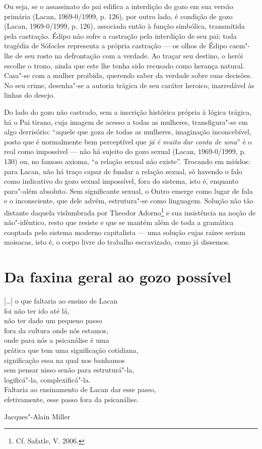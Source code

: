 Ou seja, se o assassinato do pai edifica a interdição do gozo em sua
versão primária (Lacan, 1969-0/1999, p. 126), por outro lado, é condição
de gozo (Lacan, 1969-0/1999, p. 126), associada então à função
simbólica, transmitida pela castração. Édipo não sofre a castração pela
interdição de seu pai; toda tragédia de Sófocles representa a própria
castração --- os olhos de Édipo caem"-lhe de seu rosto na defrontação com
a verdade. Ao traçar seu destino, o herói escolhe o trono, ainda que
este lhe tenha sido recusado como herança natural. Casa"-se com a mulher
proibida, querendo saber da verdade sobre suas decisões. No seu crime,
desenha"-se a autoria trágica de seu caráter heroico, inarredável às
linhas do desejo.

Do lado do gozo não castrado, sem a inscrição histórica própria à lógica
trágica, há o Pai tirano, cuja imagem de acesso a todas as mulheres,
transfigura"-se em algo derrisório: ``aquele que goza de todas as
mulheres, imaginação inconcebível, posto que é normalmente bem
perceptível que \emph{já é muito} \emph{dar conta de uma}'' é o real
como impossível --- não há sujeito do gozo sexual (Lacan, 1969-0/1999, p.
130) ou, no famoso axioma, ``a relação sexual não existe''. Trocando em
miúdos: para Lacan, não há traço capaz de fundar a relação sexual, só
havendo o falo como indicativo do gozo sexual impossível, fora do
sistema, isto é, enquanto para"-além absoluto. Sem significante sexual, o
Outro emerge como lugar de fala e o inconsciente, que dele advém,
estrutura"-se como linguagem. Solução não tão distante daquela
vislumbrada por Theodor Adorno\footnote{Cf. Safatle, V. 2006.} e sua
insistência na noção de não"-idêntico, resto que resiste e que se mantém
além de toda a gramática cooptada pelo sistema moderno capitalista ---
uma solução cujas raízes seriam moisacas, isto é, o corpo livre do
trabalho escravizado, como já dissemos.

\section{Da faxina geral ao gozo possível}

\epigraph{{[}\ldots{}{]} o que faltaria ao ensino de Lacan\\
foi não ter ido até lá,\\
não ter dado um pequeno passo\\
fora da cultura onde nós estamos,\\
onde para nós a psicanálise é uma\\
prática que tem uma significação cotidiana,\\
significação essa na qual nos banhamos\\
sem pensar nisso senão para estruturá"-la,\\
logificá"-la, complexificá"-la.\\
Faltaria ao ensinamento de Lacan dar esse passo,\\
efetivamente, esse passo fora da psicanálise.}{Jacques"-Alain Miller}


